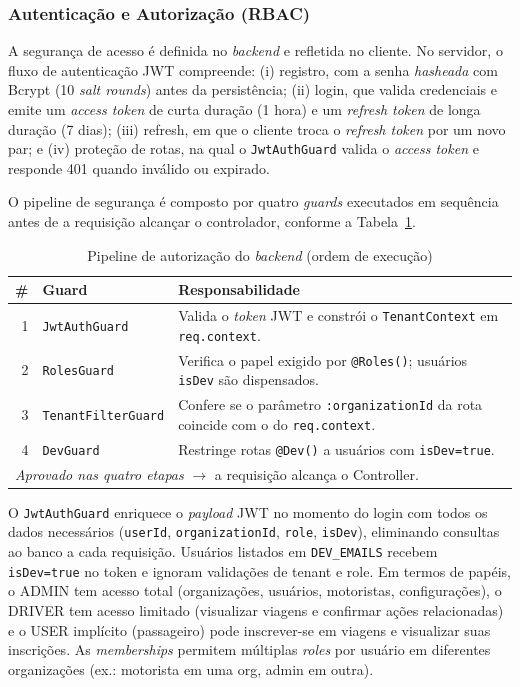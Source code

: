 \subsubsection{Autenticação e Autorização (RBAC)}
\label{sec:autenticacao}

A segurança de acesso é definida no \textit{backend} e refletida no cliente. No servidor, o fluxo de autenticação JWT compreende: (i) registro, com a senha \textit{hasheada} com Bcrypt (10 \textit{salt rounds}) antes da persistência; (ii) login, que valida credenciais e emite um \textit{access token} de curta duração (1 hora) e um \textit{refresh token} de longa duração (7 dias); (iii) refresh, em que o cliente troca o \textit{refresh token} por um novo par; e (iv) proteção de rotas, na qual o \texttt{JwtAuthGuard} valida o \textit{access token} e responde 401 quando inválido ou expirado.

O pipeline de segurança é composto por quatro \textit{guards} executados em sequência antes de a requisição alcançar o controlador, conforme a Tabela~\ref{tab:auth_pipeline}.

\begin{table}[H]
\centering
\caption{Pipeline de autorização do \textit{backend} (ordem de execução)}
\label{tab:auth_pipeline}
\begin{tabularx}{\textwidth}{r l X}
\toprule
\textbf{\#} & \textbf{Guard} & \textbf{Responsabilidade} \\
\midrule
1 & \texttt{JwtAuthGuard}      & Valida o \textit{token} JWT e constrói o \texttt{TenantContext} em \texttt{req.context}. \\
2 & \texttt{RolesGuard}        & Verifica o papel exigido por \texttt{@Roles()}; usuários \texttt{isDev} são dispensados. \\
3 & \texttt{TenantFilterGuard} & Confere se o parâmetro \texttt{:organizationId} da rota coincide com o do \texttt{req.context}. \\
4 & \texttt{DevGuard}          & Restringe rotas \texttt{@Dev()} a usuários com \texttt{isDev=true}. \\
\midrule
\multicolumn{3}{l}{\textit{Aprovado nas quatro etapas} $\rightarrow$ a requisição alcança o Controller.} \\
\bottomrule
\end{tabularx}
\end{table}

O \texttt{JwtAuthGuard} enriquece o \textit{payload} JWT no momento do login com todos os dados necessários (\texttt{userId}, \texttt{organizationId}, \texttt{role}, \texttt{isDev}), eliminando consultas ao banco a cada requisição. Usuários listados em \texttt{DEV\_EMAILS} recebem \texttt{isDev=true} no token e ignoram validações de tenant e role. Em termos de papéis, o ADMIN tem acesso total (organizações, usuários, motoristas, configurações), o DRIVER tem acesso limitado (visualizar viagens e confirmar ações relacionadas) e o USER implícito (passageiro) pode inscrever-se em viagens e visualizar suas inscrições. As \textit{memberships} permitem múltiplas \textit{roles} por usuário em diferentes organizações (ex.: motorista em uma org, admin em outra).

